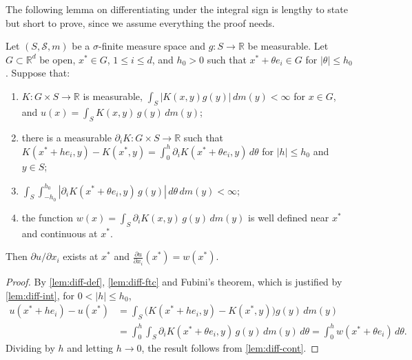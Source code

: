 The following lemma on differentiating under the integral sign is lengthy to
state but short to prove, since we assume everything the proof needs.

\begin{lemma}\label{lem:diff}
	Let $(S,\mathcal{S},m)$ be a $\sigma$-finite measure space and
	$g:S\to\mathbb{R}$ be measurable. Let $G\subset\mathbb{R}^d$ be open,
	$x^*\in G$, $1\leqslant i\leqslant d$, and $h_0>0$ such that
	$x^*+\theta e_i\in G$ for $|\theta|\leqslant h_0$. Suppose that:
	\begin{enumerate}[label=(\roman*)]
		\item\label{lem:diff-def} $K:G\times S\to\mathbb{R}$ is measurable,
		      $\int_S|K(x,y)g(y)|\,dm(y)<\infty$ for $x\in G$, and
		      $u(x) = \int_S K(x,y)\,g(y)\,dm(y)$;
		\item\label{lem:diff-ftc} there is a measurable
		      $\partial_iK:G\times S\to\mathbb{R}$ such that
		      $K(x^*+he_i,y) - K(x^*,y) = \int_0^h\partial_iK(x^*+\theta e_i,y)\,d\theta$
		      for $|h|\leqslant h_0$ and $y\in S$;
		\item\label{lem:diff-int}
		      $\int_S\int_{-h_0}^{h_0}|\partial_iK(x^*+\theta e_i,y)\,g(y)|\,d\theta\,dm(y)<\infty$;
		\item\label{lem:diff-cont} the function
		      $w(x) = \int_S\partial_iK(x,y)\,g(y)\,dm(y)$ is well defined near
		      $x^*$ and continuous at $x^*$.
	\end{enumerate}
	Then $\partial u/\partial x_i$ exists at $x^*$ and
	$\frac{\partial u}{\partial x_i}(x^*) = w(x^*)$.
\end{lemma}
\begin{proof}
	By \ref{lem:diff-def}, \ref{lem:diff-ftc} and Fubini's theorem, which is
	justified by \ref{lem:diff-int}, for $0<|h|\leqslant h_0$,
	\begin{align*}
		u(x^*+he_i) - u(x^*) & = \int_S\bigl(K(x^*+he_i,y) - K(x^*,y)\bigr)g(y)\,dm(y) \\
		                     & = \int_0^h\int_S\partial_iK(x^*+\theta e_i,y)\,g(y)\,dm(y)\,d\theta
		= \int_0^h w(x^*+\theta e_i)\,d\theta .
	\end{align*}
	Dividing by $h$ and letting $h\to0$, the result follows from
	\ref{lem:diff-cont}.
\end{proof}

